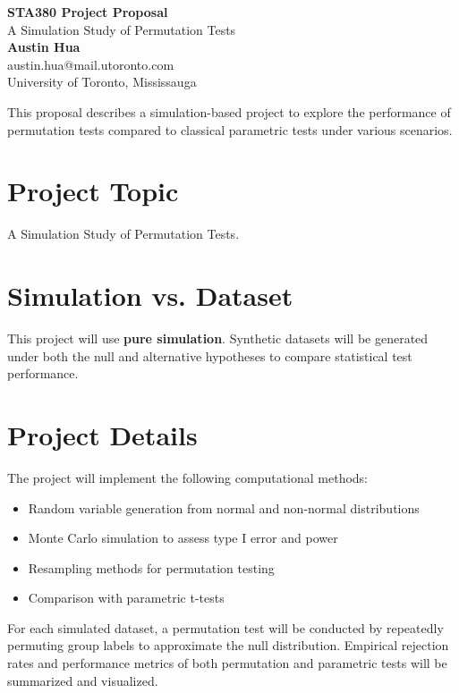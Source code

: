 \documentclass{article}
\begin{document}
    \begin{center}
        \LARGE{\textbf{STA380 Project Proposal}} \\
        \vspace{1em}
        \Large{A Simulation Study of Permutation Tests} \\
        \vspace{1em}
        \normalsize\textbf{Austin Hua} \\
        \normalsize{austin.hua@mail.utoronto.com} \\
        \vspace{1em}
        \normalsize{University of Toronto, Mississauga}
    \end{center}

    \begin{normalsize}
        This proposal describes a simulation-based project to explore the performance of permutation tests compared to classical parametric tests under various scenarios.

        \section*{Project Topic}
        A Simulation Study of Permutation Tests.

        \section*{Simulation vs. Dataset}
        This project will use \textbf{pure simulation}. Synthetic datasets will be generated under both the null and alternative hypotheses to compare statistical test performance.

        \section*{Project Details}
        The project will implement the following computational methods:
        \begin{itemize}
            \item Random variable generation from normal and non-normal distributions
            \item Monte Carlo simulation to assess type I error and power
            \item Resampling methods for permutation testing
            \item Comparison with parametric t-tests
        \end{itemize}
        For each simulated dataset, a permutation test will be conducted by repeatedly permuting group labels to approximate the null distribution. Empirical rejection rates and performance metrics of both permutation and parametric tests will be summarized and visualized.


\end{normalsize}
\end{document}
